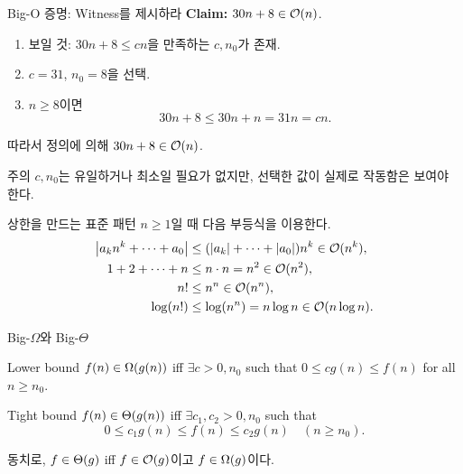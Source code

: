 \begin{frame}{Big-O 증명: Witness를 제시하라}
  \textbf{Claim:} $30n+8\in\mathcal{O}(n)$.
  \begin{enumerate}
    \item 보일 것: $30n+8\le cn$을 만족하는 $c,n_0$가 존재.
    \item $c=31$, $n_0=8$을 선택.
    \item $n\ge8$이면
      \[
        30n+8\le30n+n=31n=cn.
      \]
  \end{enumerate}
  따라서 정의에 의해 $30n+8\in\mathcal{O}(n)$.
  \begin{block}{주의}
    $c,n_0$는 유일하거나 최소일 필요가 없지만, 선택한 값이 실제로 작동함은 보여야 한다.
  \end{block}
\end{frame}

\begin{frame}{상한을 만드는 표준 패턴}
  $n\ge1$일 때 다음 부등식을 이용한다.
  \begin{align*}
    \left|a_kn^k+\cdots+a_0\right|
      &\le (|a_k|+\cdots+|a_0|)n^k \in\mathcal{O}(n^k),\\
    1+2+\cdots+n
      &\le n\cdot n=n^2 \in\mathcal{O}(n^2),\\
    n!&\le n^n\in\mathcal{O}(n^n),\\
    \log(n!)&\le\log(n^n)=n\log n\in\mathcal{O}(n\log n).
  \end{align*}
\end{frame}

\begin{frame}{Big-$\Omega$와 Big-$\Theta$}
  \begin{block}{Lower bound}
    $f(n)\in\Omega(g(n))$ iff $\exists c>0,n_0$ such that
    $0\le c g(n)\le f(n)$ for all $n\ge n_0$.
  \end{block}
  \begin{block}{Tight bound}
    $f(n)\in\Theta(g(n))$ iff $\exists c_1,c_2>0,n_0$ such that
    \[
      0\le c_1g(n)\le f(n)\le c_2g(n)\quad(n\ge n_0).
    \]
  \end{block}
  동치로, $f\in\Theta(g)$ iff $f\in\mathcal{O}(g)$이고 $f\in\Omega(g)$이다.
\end{frame}

